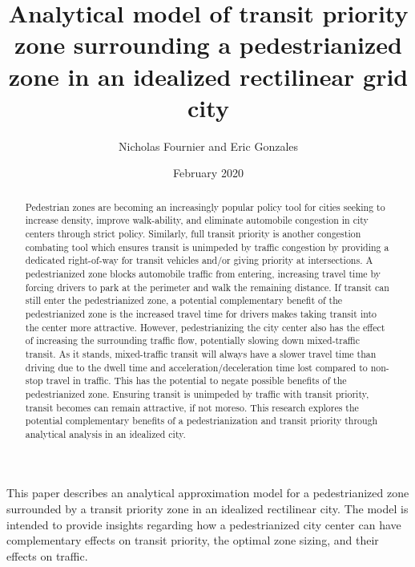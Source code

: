 \documentclass{article}
\title{Analytical model of transit priority zone surrounding a pedestrianized zone in an idealized rectilinear grid city}
\author{Nicholas Fournier and Eric Gonzales}
\date{February 2020}
\begin{document}
\maketitle


This paper describes an analytical approximation model for a pedestrianized zone surrounded by a transit priority zone in an idealized rectilinear city. The model is intended to provide insights regarding how a pedestrianized city center can have complementary effects on transit priority, the optimal zone sizing, and their effects on traffic. 

\begin{abstract}
Pedestrian zones are becoming an increasingly popular policy tool for cities seeking to increase density, improve walk-ability, and eliminate automobile congestion in city centers through strict policy. Similarly, full transit priority is another congestion combating tool which ensures transit is unimpeded by traffic congestion by providing a dedicated right-of-way for transit vehicles and/or giving priority at intersections. A pedestrianized zone blocks automobile traffic from entering, increasing travel time by forcing drivers to park at the perimeter and walk the remaining distance. If transit can still enter the pedestrianized zone, a potential complementary benefit of the pedestrianized zone is the increased travel time for drivers makes taking transit into the center more attractive. However, pedestrianizing the city center also has the effect of increasing the surrounding traffic flow, potentially slowing down mixed-traffic transit. As it stands, mixed-traffic transit will always have a slower travel time than driving due to the dwell time and acceleration/deceleration time lost compared to non-stop travel in traffic. This has the potential to negate possible benefits of the pedestrianized zone. Ensuring transit is unimpeded by traffic with transit priority, transit becomes can remain attractive, if not moreso. This research explores the potential complementary benefits of a pedestrianization and transit priority through analytical analysis in an idealized city. 
\vfill


\end{abstract}

\newpage
\end{document}
